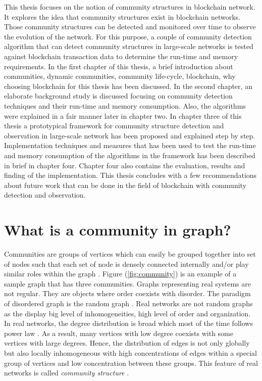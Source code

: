 This thesis focuses on the notion of community structures in blockchain network. It explores the idea that community structures exist in blockchain networks. Those community structures can be detected and monitored over time to observe the evolution of the network. For this purpose, a couple of community detection algorithm that can detect community structures in large-scale networks is tested against blockchain transaction data to determine the run-time and memory requirements. In the first chapter of this thesis, a brief introduction about communities, dynamic communities, community life-cycle, blockchain, why choosing blockchain for this thesis has been discussed. In the second chapter, an elaborate background study is discussed focusing on community detection techniques and their run-time and memory consumption. Also, the algorithms were explained in a fair manner later in chapter two. In chapter three of this thesis a prototypical framework for community structure detection and observation in large-scale network has been proposed and explained step by step. Implementation techniques and measures that has been used to test the run-time and memory consumption of the algorithms in the framework has been described in brief in chapter four. Chapter four also contains the evaluation, results and finding of the implementation. This thesis concludes with a few recommendations about future work that can be done in the field of blockchain with community detection and observation.

\section{What is a community in graph?}\label{community_in_graph}
Communities are groups of vertices which can easily be grouped together into set of nodes such that each set of node is densely connected internally and/or play similar roles within the graph \cite{ref-6}. Figure (\ref{fig:community}) is an example of a sample graph that has three communities. Graphs representing real systems are not regular. They are objects where order coexists with disorder. The paradigm of disordered graph is the random graph \cite{ref-21}. Real networks are not random  graphs as the display big level of inhomogeneities, high level of order and organization. In real networks, the degree distribution is broad which most of the time follows power law \cite{ref-6}. As a result, many vertices with low degree coexists with some vertices with large degrees. Hence, the distribution of edges is not only globally but also locally inhomogeneous with high concentrations of edges within a special group of vertices and low concentration between these groups. This feature of real networks is called \textit{community structure} \cite{ref-1}.

